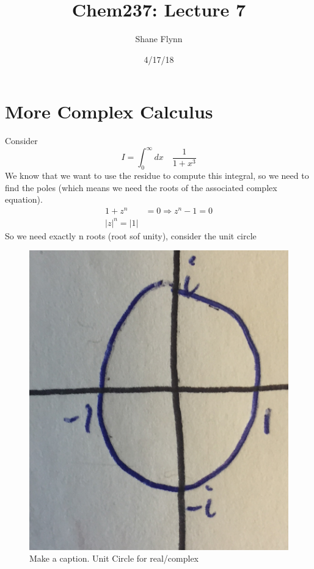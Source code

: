 \documentclass{article}
\title{Chem237: Lecture 7}
\date{4/17/18}
\author{Shane Flynn}
\newcommand{\be}{\begin{equation}}
\newcommand{\ee}{\end{equation}}
\begin{document}
\maketitle

\section*{More Complex Calculus}
Consider
\be
I = \int_0^\infty dx \quad \frac{1}{1+x^3}
\ee
We know that we want to use the residue to compute this integral, so we need to find the poles (which means we need the roots of the associated complex equation). 
\be
\begin{split}
    1 + z^n &= 0 \Rightarrow z^n - 1 = 0\\
    |z|^n = |1|
\end{split}
\ee
So we need exactly n roots (root sof unity), consider the unit circle 

\begin{figure}[H]
  \centering
    \includegraphics[scale=0.2]{Figures/unit.png}
    \caption{Make a caption. Unit Circle for real/complex}
\end{figure}
\end{document}
